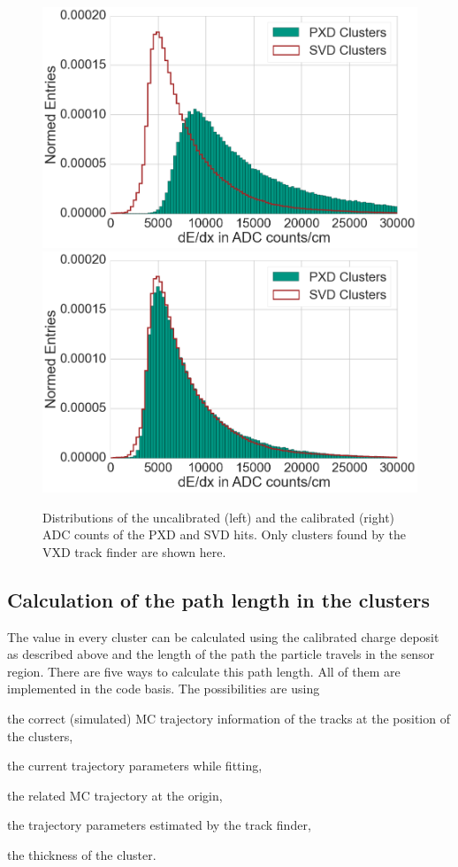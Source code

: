 \begin{figure}
  \centering
 \includegraphics[width=0.48\linewidth]{figures/vxd/dEdXUncalibrated.png}
 \includegraphics[width=0.48\linewidth]{figures/vxd/dEdXCalibrated.png}
 \caption[Distributions of the uncalibrated and the calibrated ADC counts.]{Distributions of the uncalibrated (left) and the calibrated (right) ADC counts of the PXD and SVD hits. Only clusters found by the VXD track finder are shown here.}
 \label{fig-adc-count}
\end{figure}

\subsection{Calculation of the path length in the clusters} \label{subsection-calc}
The \dedx value in every cluster can be calculated using the calibrated charge deposit as described above and the length of the path the particle travels in the sensor region. There are five ways to calculate this path length. All of them are implemented in the code basis. The possibilities are using
\begin{zlist}
 \item the correct (simulated) MC trajectory information of the tracks at the position of the clusters, \label{list-mc}
 \item the current trajectory parameters while fitting,
 \item the related MC trajectory at the origin,
 \item the trajectory parameters estimated by the track finder,
 \item the thickness of the cluster.
\end{zlist}

